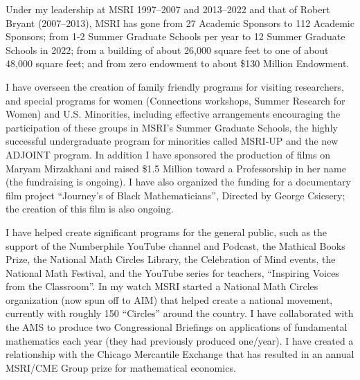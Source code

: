 \smallbreak
\item{} 
Under my leadership at MSRI 1997--2007 and 2013--2022 and that of Robert Bryant (2007--2013), MSRI has gone from 27 Academic Sponsors to 112 Academic Sponsors; from 1-2 Summer Graduate Schools per year to 12 Summer Graduate Schools in 2022; from a building of about 26,000 square feet to one of about 48,000 square feet; and from zero endowment to about \$130 Million Endowment.
\smallbreak
\item{} 
I have overseen the creation of family friendly programs for visiting researchers, and special programs for women (Connections workshops, Summer Research for Women) and U.S. Minorities, including effective arrangements encouraging the participation of these groups in MSRI's Summer Graduate Schools, the highly successful undergraduate program for minorities called MSRI-UP and the new ADJOINT program. In addition I have sponsored the production of films on Maryam Mirzakhani and  raised \$1.5 Million toward a Professorship in her name (the fundraising is ongoing). I have also organized the funding for a documentary film project ``Journey's of Black Mathematicians'', Directed by George Csicsery; the creation of this film is also ongoing.
\smallbreak
\item{} 
I have helped create significant programs for the general public, such as the support of the Numberphile YouTube channel and Podcast, the Mathical Books Prize, the National Math Circles Library, the Celebration of Mind events, the National Math Festival, and the YouTube series for teachers, ``Inspiring Voices from the Classroom''. In my watch MSRI started a National Math Circles organization (now spun off to AIM) that helped create a national movement, currently with roughly 150 ``Circles'' around the country. I have collaborated with the AMS to produce two Congressional Briefings on applications of fundamental mathematics each year (they had previously produced one/year). I have created a relationship with the Chicago Mercantile Exchange that has resulted in an annual MSRI/CME Group prize for mathematical economics.

